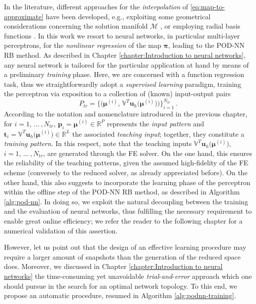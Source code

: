 \documentclass[12pt, a4paper, twoside, openright, notitlepage]{report}
\numberwithin{equation}{chapter}
\theoremstyle{theorem}
\theoremstyle{definition}
\theoremstyle{remark}
\theoremstyle{proposition}
\numberwithin{figure}{chapter}
\newcommand{\bg}[1]{\boldsymbol{#1}}
\begin{document}
		In the literature, different approaches for the \emph{interpolation} of \eqref{eq:map-to-approximate} have been developed, e.g., exploiting some geometrical considerations concerning the solution manifold $\mathcal{M}$ \cite{Ams10}, or employing radial basis functions \cite{Chen17}. In this work we resort to neural networks, in particular multi-layer perceptrons, for the \emph{nonlinear regression} of the map $\bg{\pi}$, leading to the POD-NN RB method. As described in Chapter \ref{chapter:Introduction to neural networks}, any neural network is tailored for the particular application at hand by means of a preliminary \emph{training} phase. Here, we are concerned with a function regression task, thus we straightforwardly adopt a \emph{supervised learning} paradigm, training the perceptron via exposition to a collection of (known) input-output pairs
		\begin{equation*}
			P_{tr} = \big\lbrace \big( \bg{\mu}^{(i)}, \, \mathbb{V}^T \mathbf{u}_h \big( \bg{\mu}^{(i)} \big) \big) \big\rbrace_{i = 1}^{N_{tr}} \, .
		\end{equation*} 
		According to the notation and nomenclature introduced in the previous chapter, for $i = 1, \, \ldots \, , N_{tr}$, $\mathbf{p}_i = \bg{\mu}^{(i)} \in \mathbb{R}^P$ represents the \emph{input pattern} and $\mathbf{t}_i =  \mathbb{V}^T \mathbf{u}_h \big( \bg{\mu}^{(i)} \big) \in \mathbb{R}^L$ the associated \emph{teaching input}; together, they constitute a \emph{training pattern}. In this respect, note that the teaching inputs $\mathbb{V}^T \mathbf{u}_h \big( \bg{\mu}^{(i)} \big)$, $i = 1, \, \ldots \, , N_{tr}$, are generated through the FE solver. On the one hand, this ensures the reliability of the teaching patterns, given the assumed high-fidelity of the FE scheme (conversely to the reduced solver, as already appreciated before). On the other hand, this also suggests to incorporate the learning phase of the perceptron within the offline step of the POD-NN RB method, as described in Algorithm \ref{alg:pod-nn}. In doing so, we exploit the natural decoupling between the training and the evaluation of neural networks, thus fulfilling the necessary requirement to enable great online efficiency; we refer the reader to the following chapter for a numerical validation of this assertion. 
		
		However, let us point out that the design of an effective learning procedure may require a larger amount of snapshots than the generation of the reduced space does. Moreover, we discussed in Chapter \ref{chapter:Introduction to neural networks} the time-consuming yet unavoidable \emph{trial}-\emph{and}-\emph{error} approach which one should pursue in the search for an optimal network topology. To this end, we propose an automatic procedure, resumed in Algorithm \ref{alg:podnn-training}.
		
\end{document}

